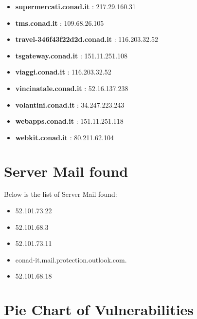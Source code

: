 \documentclass{article}
\begin{document}
\begin{itemize}
        \item \textbf{ supermercati.conad.it }: 217.29.160.31
    
        \item \textbf{ tms.conad.it }: 109.68.26.105
    
        \item \textbf{ travel-346f43f22d2d.conad.it }: 116.203.32.52
    
        \item \textbf{ tsgateway.conad.it }: 151.11.251.108
    
        \item \textbf{ viaggi.conad.it }: 116.203.32.52
    
        \item \textbf{ vincinatale.conad.it }: 52.16.137.238
    
        \item \textbf{ volantini.conad.it }: 34.247.223.243
    
        \item \textbf{ webapps.conad.it }: 151.11.251.118
    
        \item \textbf{ webkit.conad.it }: 80.211.62.104
    
\end{itemize}

\section*{Server Mail found}

Below is the list of Server Mail found:

\begin{itemize}
    
        \item 52.101.73.22
    
        \item 52.101.68.3
    
        \item 52.101.73.11
    
        \item conad-it.mail.protection.outlook.com.
    
        \item 52.101.68.18
    
\end{itemize}

\section*{Pie Chart of Vulnerabilities}
\end{document}
